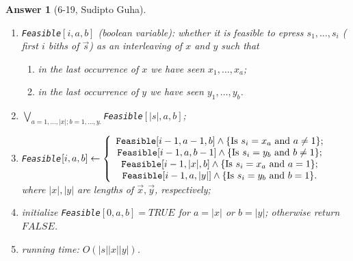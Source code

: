 \documentclass[11pt]{article}
\theoremstyle{numberplain}
\theoremstyle{nonumberplain}
\newtheorem{ans}{Answer}
\newcommand{\0}{{\mathbf{0}}}
\begin{document}
\begin{ans}[6-19, Sudipto Guha]
\begin{enumerate}
\item {\tt Feasible}$[i,a,b]$ (boolean variable): whether it is feasible to epress $s_1,\ldots, s_i$ ( first $i$ biths of $\vec{s}$) as an interleaving of $x$ and $y$ such that 
\begin{enumerate}
\item in the last occurrence of $x$ we have seen $x_1,\ldots, x_a$;
\item in the last occurrence of $y$ we have seen $y_1,\ldots, y_b$.
\end{enumerate}
\item $\bigvee_{a=1,\ldots,|x|;b=1,\ldots,{y}.}${\tt Feasible}$[|s|,a,b]$;
\item {\tt Feasible}$[i,a,b]\leftarrow \left\{\begin{array}{c}
{\tt Feasible}[i-1,a-1,b]\wedge \{\text{Is }s_i=x_a\text{ and }a\neq 1\};\\
{\tt Feasible}[i-1,a,b-1]\wedge \{\text{Is }s_i=y_b\text{ and }b\neq 1\};\\
{\tt Feasible}[i-1,|x|,b]\wedge \{\text{Is }s_i=x_a\text{ and }a= 1\};\\
{\tt Feasible}[i-1,a,|y|]\wedge \{\text{Is }s_i=y_b\text{ and }b=1\}.
\end{array}\right.$
where $|x|,|y|$ are lengths of $\vec{x},\vec{y}$, respectively;
\item initialize  {\tt Feasible}$[0,a,b]=TRUE$ for $a=|x|$ or $b=|y|$; otherwise return $FALSE$.
\item running time: $O(|s||x||y|)$.
\end{enumerate}
\end{ans}
\end{document}
